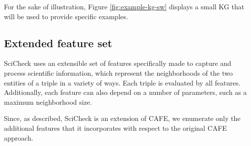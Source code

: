 For the sake of illustration, Figure \ref{fig:example-kg-sw} displays a small KG that will be used to provide specific examples.

\subsection{Extended feature set}
SciCheck uses an extensible set of features specifically made to capture and process scientific information, which represent the neighborhoods of the two entities of a triple in a variety of ways. Each triple is evaluated by all features. Additionally, each feature can also depend on a number of parameters, such as a maximum neighborhood size. 

Since, as described, SciCheck is an extension of CAFE, we enumerate only the additional features that it incorporates with respect to the original CAFE approach.




